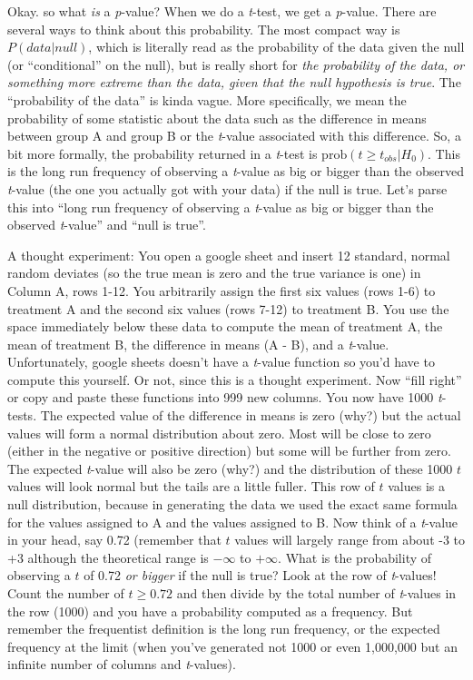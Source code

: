 \documentclass[]{book}
\begin{document}
Okay. so what \emph{is} a \emph{p}-value? When we do a \emph{t}-test, we get a \emph{p}-value. There are several ways to think about this probability. The most compact way is \(P(data | null)\), which is literally read as the probability of the data given the null (or ``conditional'' on the null), but is really short for \emph{the probability of the data, or something more extreme than the data, given that the null hypothesis is true}. The ``probability of the data'' is kinda vague. More specifically, we mean the probability of some statistic about the data such as the difference in means between group A and group B or the \emph{t}-value associated with this difference. So, a bit more formally, the probability returned in a \emph{t}-test is \(\mathrm{prob}(t \ge t_{obs} | H_0)\). This is the long run frequency of observing a \emph{t}-value as big or bigger than the observed \emph{t}-value (the one you actually got with your data) if the null is true. Let's parse this into ``long run frequency of observing a \emph{t}-value as big or bigger than the observed \emph{t}-value'' and ``null is true''.

A thought experiment: You open a google sheet and insert 12 standard, normal random deviates (so the true mean is zero and the true variance is one) in Column A, rows 1-12. You arbitrarily assign the first six values (rows 1-6) to treatment A and the second six values (rows 7-12) to treatment B. You use the space immediately below these data to compute the mean of treatment A, the mean of treatment B, the difference in means (A - B), and a \emph{t}-value. Unfortunately, google sheets doesn't have a \emph{t}-value function so you'd have to compute this yourself. Or not, since this is a thought experiment. Now ``fill right'' or copy and paste these functions into 999 new columns. You now have 1000 \emph{t}-tests. The expected value of the difference in means is zero (why?) but the actual values will form a normal distribution about zero. Most will be close to zero (either in the negative or positive direction) but some will be further from zero. The expected \emph{t}-value will also be zero (why?) and the distribution of these 1000 \(t\) values will look normal but the tails are a little fuller. This row of \(t\) values is a null distribution, because in generating the data we used the exact same formula for the values assigned to A and the values assigned to B. Now think of a \emph{t}-value in your head, say 0.72 (remember that \(t\) values will largely range from about -3 to +3 although the theoretical range is \(-\infty\) to \(+\infty\). What is the probability of observing a \(t\) of 0.72 \emph{or bigger} if the null is true? Look at the row of \emph{t}-values! Count the number of \(t \ge 0.72\) and then divide by the total number of \emph{t}-values in the row (1000) and you have a probability computed as a frequency. But remember the frequentist definition is the long run frequency, or the expected frequency at the limit (when you've generated not 1000 or even 1,000,000 but an infinite number of columns and \emph{t}-values).
\end{document}
